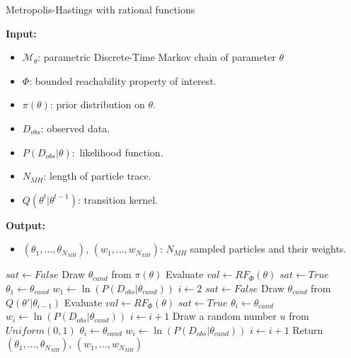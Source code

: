 \begin{algorithm}[H]
    \caption{Metropolis-Hastings with rational functions}
    \label{alg:rf-mcmc}
    \footnotesize{
        \hspace*{\algorithmicindent} \textbf{Input:}
        \begin{itemize}[noitemsep,topsep=0pt]
            \item $\mathcal{M}_\theta$: parametric Discrete-Time Markov chain of parameter $\theta$
            \item $\Phi$: bounded reachability property of interest.
            \item $\pi(\theta)$: prior distribution on $\theta$.
            \item $D_{obs}$: observed data.
            \item $P(D_{obs}|\theta):$ likelihood function.
            \item $N_{MH}$: length of particle trace.
            \item $Q(\theta^t|\theta^{t-1})$: transition kernel.
        \end{itemize}
        \hspace*{\algorithmicindent} \textbf{Output:}
        \begin{itemize}[noitemsep,topsep=0pt]
            \item $(\theta_1,\ldots,\theta_{N_{MH}})$, $(w_1,\ldots,w_{N_{MH}})$: $N_{MH}$ sampled
                  particles and their weights.
        \end{itemize}
    }
    \begin{algorithmic}[1]
        \State $sat \leftarrow False$
        \State Draw $\theta_{cand}$ from $\pi(\theta)$
        \State Evaluate $val \leftarrow RF_{\Phi}(\theta)$
        \State $sat \leftarrow True$
        \EndIf
        \EndWhile
        \State $\theta_1 \leftarrow  \theta_{cand}$
        \State $w_1 \leftarrow  \ln(P(D_{obs}|\theta_{cand}))$
        \State $i \leftarrow 2$
        \State $sat \leftarrow False $
        \State Draw $\theta_{cand}$ from $Q(\theta'|\theta_{i-1})$
        \State Evaluate $val \leftarrow RF_{\Phi}(\theta)$
        \State $sat \leftarrow True$
        \EndIf
        \EndWhile
        \State $\theta_i \leftarrow \theta_{cand}$
        \State $w_i \leftarrow \ln(P(D_{obs}|\theta_{cand}))$
        \State $i \leftarrow i + 1$
        \Else
        \State Draw a random number $u$ from $Uniform(0,1)$
        \State $\theta_i \leftarrow \theta_{cand}$
        \State $w_i \leftarrow \ln(P(D_{obs}|\theta_{cand}))$
        \State $i \leftarrow i + 1$
        \EndIf
        \EndIf
        \EndWhile
        \State Return $(\theta_1,\ldots,\theta_{N_{MH}})$, $(w_1,\ldots,w_{N_{MH}})$
        \EndProcedure
    \end{algorithmic}
\end{algorithm}
